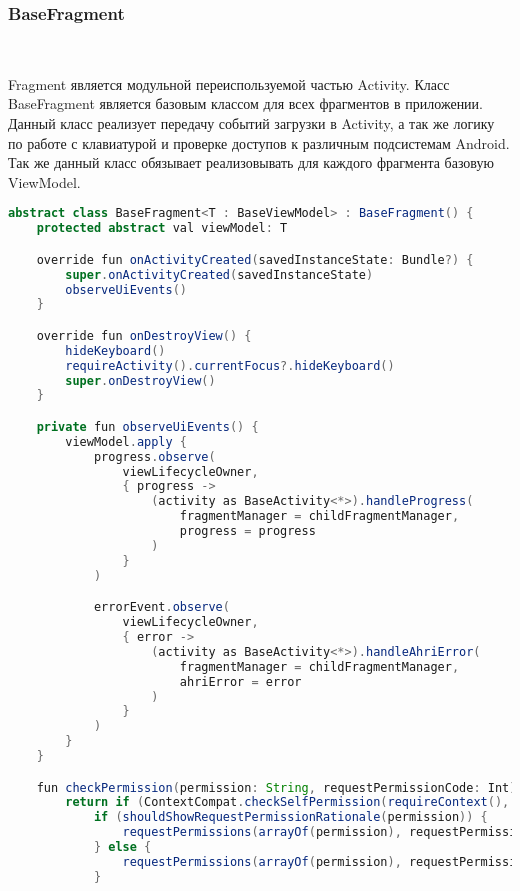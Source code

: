\subsubsection{BaseFragment}~\par
Fragment является модульной переиспользуемой частью Activity. Класс BaseFragment является базовым классом для всех фрагментов в приложении. Данный класс реализует передачу событий загрузки в Activity, а так же логику по работе с клавиатурой и проверке доступов к различным подсистемам Android. Так же данный класс обязывает реализовывать для каждого фрагмента базовую ViewModel.

\begin{lstlisting}[language=Java,label={lst:baseFragment},caption={Компонент BaseFragment}]
abstract class BaseFragment<T : BaseViewModel> : BaseFragment() {
    protected abstract val viewModel: T

    override fun onActivityCreated(savedInstanceState: Bundle?) {
        super.onActivityCreated(savedInstanceState)
        observeUiEvents()
    }

    override fun onDestroyView() {
        hideKeyboard()
        requireActivity().currentFocus?.hideKeyboard()
        super.onDestroyView()
    }

    private fun observeUiEvents() {
        viewModel.apply {
            progress.observe(
                viewLifecycleOwner,
                { progress ->
                    (activity as BaseActivity<*>).handleProgress(
                        fragmentManager = childFragmentManager,
                        progress = progress
                    )
                }
            )

            errorEvent.observe(
                viewLifecycleOwner,
                { error ->
                    (activity as BaseActivity<*>).handleAhriError(
                        fragmentManager = childFragmentManager,
                        ahriError = error
                    )
                }
            )
        }
    }

    fun checkPermission(permission: String, requestPermissionCode: Int): Boolean {
        return if (ContextCompat.checkSelfPermission(requireContext(), permission) != PackageManager.PERMISSION_GRANTED) {
            if (shouldShowRequestPermissionRationale(permission)) {
                requestPermissions(arrayOf(permission), requestPermissionCode)
            } else {
                requestPermissions(arrayOf(permission), requestPermissionCode)
            }


\end{lstlisting}
